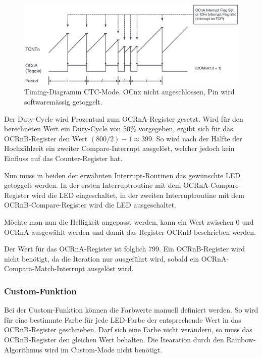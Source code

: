 \begin{figure}[h!]
	\centering
	\includegraphics[width=\textwidth]{graphics/Timer_CTC_Timing_Diagram}
	\caption{Timing-Diagramm CTC-Mode. OCnx nicht angeschlossen, Pin wird softwaremässig getoggelt.}
	\label{fig:Timer_CTC_Timing_Diagram}
\end{figure}


Der Duty-Cycle wird Prozentual zum OCRnA-Register gesetzt. Wird für den berechneten Wert ein Duty-Cycle von 50\% vorgegeben, ergibt sich für das OCRnB-Register den Wert $(800 / 2) -1 \approx 399$. So wird nach der Hälfte der Hochzählzeit ein zweiter Compare-Interrupt ausgelöst, welcher jedoch kein Einfluss auf das Counter-Register hat.

Nun muss in beiden der erwähnten Interrupt-Routinen das gewünschte LED getoggelt werden. In der ersten Interruptroutine mit dem OCRnA-Compare-Register wird die LED eingeschaltet, in der zweiten Interruptroutine mit dem OCRnB-Compare-Register wird die LED ausgeschaltet.

Möchte man nun die Helligkeit angepasst werden, kann ein Wert zwischen 0 und OCRnA ausgewählt werden und damit das Register OCRnB beschrieben werden.


Der Wert für das OCRnA-Register ist folglich 799. Ein OCRnB-Register wird nicht benötigt, da die Iteration nur ausgeführt wird, sobald ein OCRnA-Compara-Match-Interrupt ausgelöst wird.

\subsubsection{Custom-Funktion}

Bei der Custom-Funktion können die Farbwerte manuell definiert werden. So wird für eine bestimmte Farbe für jede LED-Farbe der entsprechende Wert in das OCRnB-Register geschrieben. Darf sich eine Farbe nicht verändern, so muss das OCRnB-Register den gleichen Wert behalten. Die Itearation durch den Rainbow-Algorithmus wird im Custom-Mode nicht benötigt.

